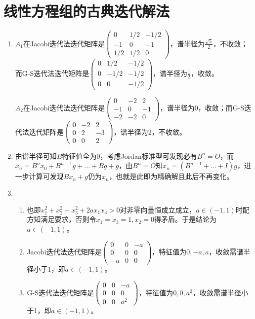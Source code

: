 \documentclass[a4paper,UTF8,fontset=windows]{ctexart}
\begin{document}
\section{线性方程组的古典迭代解法}
\begin{enumerate}
\item
$A_1$在Jacobi迭代法迭代矩阵是$\begin{pmatrix}0&1/2&-1/2\\-1&0&-1\\1/2&1/2&0\end{pmatrix}$，谱半径为$\frac{\sqrt5}{2}$，不收敛；而G-S迭代法迭代矩阵是$\begin{pmatrix}0&1/2&-1/2\\0&-1/2&-1/2\\0&0&-1/2\end{pmatrix}$，谱半径为$\frac{1}{2}$，收敛。

$A_2$在Jacobi迭代法迭代矩阵是$\begin{pmatrix}0&-2&2\\-1&0&-1\\-2&-2&0\end{pmatrix}$，谱半径为0，收敛；而G-S迭代法迭代矩阵是$\begin{pmatrix}0&-2&2\\0&2&-3\\0&0&2\end{pmatrix}$，谱半径为2，不收敛。

\item
由谱半径可知$B$特征值全为0，考虑Jordan标准型可发现必有$B^n=O$，而$x_n=B^{n}x_0+B^{n-1}g+\dots+Bg+g$，由$B^n=O$知$x_n=(B^{n-1}+\dots+I)g$，进一步计算可发现$Bx_n+g$仍为$x_n$，也就是此即为精确解且此后不再变化。

\item
\begin{enumerate}[(1)]
\item
也即$x_1^2+x_2^2+x_3^2+2ax_1x_3>0$对非零向量恒成立成立，$a\in(-1,1)$时配方知满足要求，否则令$x_1=x_3=1,x_2=0$得矛盾。于是结论为$a\in(-1,1)$。

\item
Jacobi迭代法迭代矩阵是$\begin{pmatrix}0&0&-a\\0&0&0\\-a&0&0\end{pmatrix}$，特征值为$0,-a,a$，收敛需谱半径小于1，即$a\in(-1,1)$。

\item
G-S迭代法迭代矩阵是$\begin{pmatrix}0&0&-a\\0&0&0\\0&0&a^2\end{pmatrix}$，特征值为$0,0,a^2$，收敛需谱半径小于1，即$a\in(-1,1)$。
\end{enumerate}


\end{enumerate}
\end{document}
